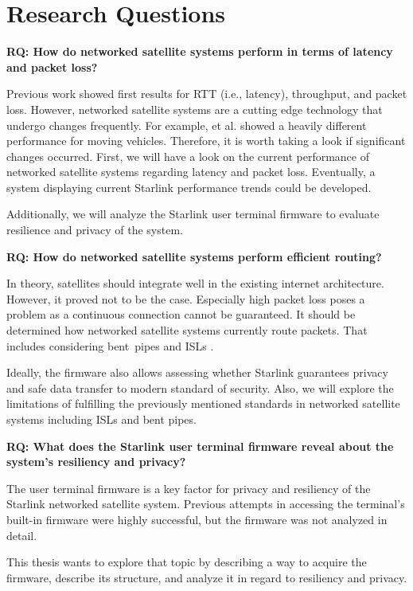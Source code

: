 \section{Research Questions} \label{sec:research-questions}

\begin{mdframed}
	\textbf{RQ: How do networked satellite systems perform in terms of latency and packet loss?}
\end{mdframed}

Previous work \cite{DBLP:conf/imc/MichelTGB22, DBLP:conf/infocom/MaCZCML23, Segan2020} showed first results for \ac{RTT} (i.e., latency), throughput, and packet loss. However, networked satellite systems are a cutting edge technology that undergo changes frequently. For example, \cite{DBLP:journals/corr/abs-2403-13497} et al. showed a heavily different performance for moving vehicles.
Therefore, it is worth taking a look if significant changes occurred. First, we will have a look on the current performance of networked satellite systems regarding latency and packet loss. Eventually, a system displaying current Starlink performance trends could be developed.

Additionally, we will analyze the Starlink user terminal firmware to evaluate resilience and privacy of the system.

\begin{mdframed}
	\textbf{RQ: How do networked satellite systems perform efficient routing?}
\end{mdframed}

In theory, satellites should integrate well in the existing internet architecture. However, it proved not to be the case. Especially high packet loss \cite{DBLP:conf/infocom/MaCZCML23} poses a problem as a continuous connection cannot be guaranteed.
It should be determined how networked satellite systems currently route packets. That includes considering bent~pipes and ISLs \cite{Hauri2020}.

Ideally, the firmware also allows assessing whether Starlink guarantees privacy and safe data transfer to modern standard of security.
Also, we will explore the limitations of fulfilling the previously mentioned standards in networked satellite systems including \ac{ISLs} and bent pipes.

\begin{mdframed}
	\textbf{RQ: What does the Starlink user terminal firmware reveal about the system's resiliency and privacy?}
\end{mdframed}

The user terminal firmware is a key factor for privacy and resiliency of the Starlink networked satellite system.
Previous attempts in accessing the terminal's built-in firmware were highly successful, but the firmware was not analyzed in detail. %

This thesis wants to explore that topic by describing a way to acquire the firmware, describe its structure, and analyze it in regard to resiliency and privacy.

